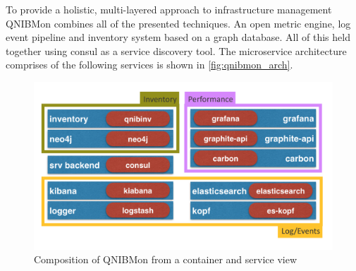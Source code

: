 To provide a holistic, multi-layered approach to infrastructure management QNIBMon combines all of the presented techniques.
An open metric engine, log event pipeline and inventory system based on a graph database. All of this held together using consul as a service discovery
tool.
The microservice architecture comprises of the following services is shown in \autoref{fig:qnibmon_arch}.
\begin{figure}[!ht]
    \includegraphics[width=.4\textwidth]{images/png/qnibmon_arch.png}
    \caption{\label{fig:qnibmon_arch}Composition of QNIBMon from a container and service view}
\end{figure}
